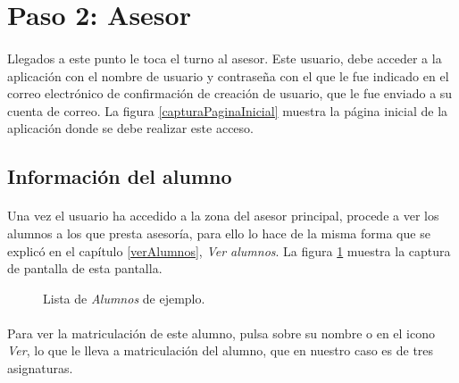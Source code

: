 \section{Paso 2: Asesor}

  \paragraph{}Llegados a este punto le toca el turno al asesor. Este usuario,
  debe acceder a la aplicación con el nombre de usuario y contraseña con el que
  le fue indicado en el correo electrónico de confirmación de creación de
  usuario, que le fue enviado a su cuenta de correo. La figura
  \ref{capturaPaginaInicial} muestra la página inicial de la aplicación donde se
  debe realizar este acceso.

  \subsection{Información del alumno}

  \paragraph{}Una vez el usuario ha accedido a la zona del asesor
  principal, procede a ver los alumnos a los que presta asesoría, para ello lo
  hace de la misma forma que se explicó en el capítulo \ref{verAlumnos},
  \textit{Ver alumnos}. La figura \ref{ejemploVerAlumnos} muestra la captura
  de pantalla de esta pantalla.

  \begin{figure}[!ht]
    \begin{center}
      \caption{Lista de \textit{Alumnos} de ejemplo.}
      \label{ejemploVerAlumnos}
    \end{center}
  \end{figure}

  \paragraph{}Para ver la matriculación de este alumno, pulsa sobre su nombre o
  en el icono \textit{Ver}, lo que le lleva a matriculación del alumno, que en
  nuestro caso es de tres asignaturas.

